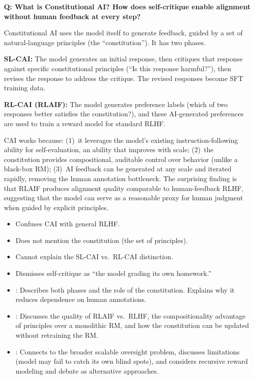 \begin{interviewq}
\textbf{Q: What is Constitutional AI?  How does self-critique enable
alignment without human feedback at every step?}

 \quad {} \quad
\badgefreq{\freqmed}

\stronganswer
Constitutional AI uses the model itself to generate feedback, guided by a
set of natural-language principles (the ``constitution'').  It has two
phases.

\textbf{SL-CAI:} The model generates an initial response, then critiques
that response against specific constitutional principles (``Is this
response harmful?''), then revises the response to address the critique.
The revised responses become SFT training data.

\textbf{RL-CAI (RLAIF):} The model generates preference labels (which of
two responses better satisfies the constitution?), and these AI-generated
preferences are used to train a reward model for standard RLHF.

CAI works because: (1)~it leverages the model's existing instruction-following
ability for self-evaluation, an ability that improves with scale;
(2)~the constitution provides compositional, auditable control over behavior
(unlike a black-box RM); (3)~AI feedback can be generated at any scale and
iterated rapidly, removing the human annotation bottleneck.  The surprising
finding is that RLAIF produces alignment quality comparable to human-feedback
RLHF, suggesting that the model can serve as a reasonable proxy for human
judgment when guided by explicit principles.

\redflags
\begin{itemize}
\item Confuses CAI with general RLHF.
\item Does not mention the constitution (the set of principles).
\item Cannot explain the SL-CAI vs.\ RL-CAI distinction.
\item Dismisses self-critique as ``the model grading its own homework.''
\end{itemize}


\goodgreat
\begin{itemize}
\item {}: Describes both phases and the role of the
  constitution.  Explains why it reduces dependence on human annotations.
\item {}: Discusses the quality of RLAIF vs.\ RLHF,
  the compositionality advantage of principles over a monolithic RM,
  and how the constitution can be updated without retraining the RM.
\item {}: Connects to the broader scalable oversight
  problem, discusses limitations (model may fail to catch its own
  blind spots), and considers recursive reward modeling and debate as
  alternative approaches.
\end{itemize}


\end{interviewq}
